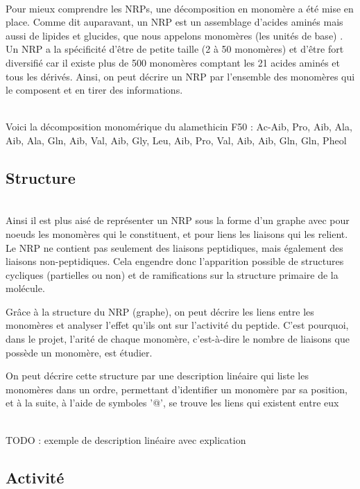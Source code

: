 \documentclass[a4paper,10pt]{report}
\begin{document}
	~~\\Pour mieux comprendre les NRPs, une décomposition en monomère a été mise en place. 
	Comme dit auparavant, un NRP est un assemblage d'acides aminés mais aussi de lipides et glucides, que nous  appelons monomères (les unités de base) . 
	Un NRP a la spécificité d'être de petite taille (2 à 50 monomères) et d'être fort diversifié car il existe plus de 500 monomères comptant les 21 acides aminés et tous les dérivés.
	Ainsi, on peut décrire un NRP par l'ensemble des monomères qui le composent et en tirer des informations. 
	
	\\Voici la décomposition monomérique du alamethicin F50 : Ac-Aib, Pro, Aib, Ala, Aib, Ala, Gln, Aib, Val, Aib, Gly, Leu, Aib, Pro, Val, Aib, Aib, Gln, Gln, Pheol
	
      \subsection{Structure}
	
	~~\\Ainsi il est plus aisé de représenter un NRP sous la forme d'un graphe avec pour noeuds les monomères qui le constituent, et pour liens les liaisons qui les relient.
	Le NRP ne contient pas seulement des liaisons peptidiques, mais également des liaisons non-peptidiques. Cela engendre donc l'apparition possible de structures cycliques (partielles ou non) et de ramifications sur la structure primaire de la molécule. 
	
	Grâce à la structure du NRP (graphe), on peut décrire les liens entre les monomères et analyser l'effet qu'ils ont sur l'activité du peptide.
	C'est pourquoi, dans le projet, l'arité de chaque monomère, c'est-à-dire le nombre de liaisons que possède un monomère, est étudier.
	
	On peut décrire cette structure par une description linéaire qui liste les monomères dans un ordre, permettant d'identifier un monomère par sa position, et à la suite, à l'aide de symboles '@', se trouve les liens qui existent entre eux
	
	\\TODO : exemple de description linéaire avec explication
	
	\subsection{Activité}
	
\end{document}
